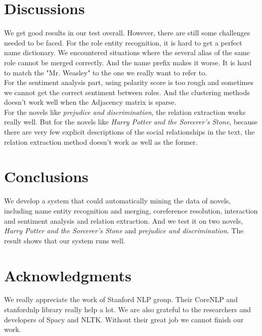 \documentclass[11pt]{article}
\begin{document}
\section{Discussions} %
We get good results in our test overall. However, there are still some challenges needed to be faced. For the role entity recognition, it is hard to get a perfect name dictionary. We encountered situations where the several alias of the same role cannot be merged correctly. And the name prefix makes it worse. It is hard to match the "Mr. Weasley" to the one we really want to refer to. \\
For the sentiment analysis part, using polarity score is too rough and sometimes we cannot get the correct sentiment between roles. And the clustering methods doesn't work well when the Adjacency matrix is sparse. \\
For the novels like \textit{prejudice and discrimination}, the relation extraction works really well. But for the novels like \textit{Harry Potter and the Sorcerer's Stone}, because there are very few explicit descriptions of the social relationships in the text, the relation extraction method doesn't work as well as the former.

\section{Conclusions} %
\label{sec:length}
We develop a system that could automatically mining the data of novels, including name entity recognition and merging, coreference resolution, interaction and sentiment analysis and relation extraction. And we test it on two novels, \textit{Harry Potter and the Sorcerer's Stone} and \textit{prejudice and discrimination}. The result shows that our system runs well.

\section*{Acknowledgments} %

We really appreciate the work of Stanford NLP group. Their CoreNLP and stanfordnlp library really help a lot. We are also grateful to the researchers and developers of Spacy and NLTK. Without their great job we cannot finish our work.



\end{document}
